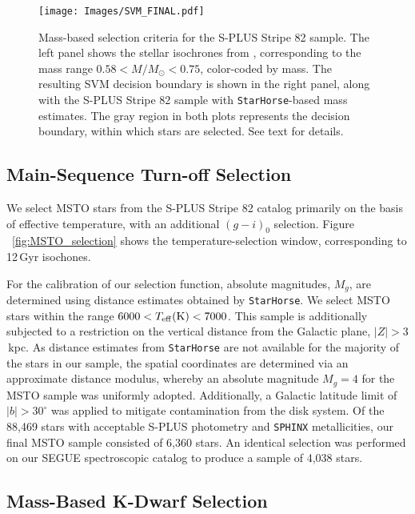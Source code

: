 \documentclass[twocolumn,trackchanges]{aastex63}
\begin{document}
\begin{figure*}
	\centering
	\texttt{[image: Images/SVM\_FINAL.pdf]}
	\caption{Mass-based selection criteria for the S-PLUS Stripe 82 sample. The left panel shows the stellar isochrones from \citet{YY:2004}, corresponding to the mass range $0.58 < M/M_{\odot} < 0.75$, color-coded by mass. The resulting SVM decision boundary is shown in the right panel, along with the S-PLUS Stripe 82 sample with \texttt{StarHorse}-based mass estimates\label{fig:SVM_MASS_SELECTION}. The gray region in both plots represents the decision boundary, within which stars are selected. See text for details.}
\end{figure*}

\subsection{Main-Sequence Turn-off Selection}

We select MSTO stars from the S-PLUS Stripe 82 catalog primarily on the basis of effective temperature, with an additional $(g-i)_0$ selection. Figure ~\ref{fig:MSTO_selection} shows the temperature-selection window, corresponding to 12\,Gyr isochones. 

For the calibration of our selection function, absolute magnitudes, $M_g$, are determined using distance estimates obtained by \texttt{StarHorse}. We select MSTO stars within the range $6000 < T_{\rm eff} \textrm{(K)} < 7000$. This sample is additionally subjected to a restriction on the vertical distance from the Galactic plane, $|Z| > 3$\,kpc. As distance estimates from \texttt{StarHorse} are not available for the majority of the stars in our sample, the spatial coordinates are determined via an approximate distance modulus, whereby an absolute magnitude $M_{g} = 4$ for the MSTO sample was uniformly adopted. Additionally, a Galactic latitude limit of $|b| > 30^{\circ}$ was applied to mitigate contamination from the disk system. Of the 88,469 stars with acceptable S-PLUS photometry and \texttt{SPHINX} metallicities, our final MSTO sample consisted of 6,360 stars. An identical selection was performed on our SEGUE spectroscopic catalog to produce a sample of 4,038 stars.

\subsection{Mass-Based K-Dwarf Selection}\label{sec:dwarf_selection}
\end{document}
